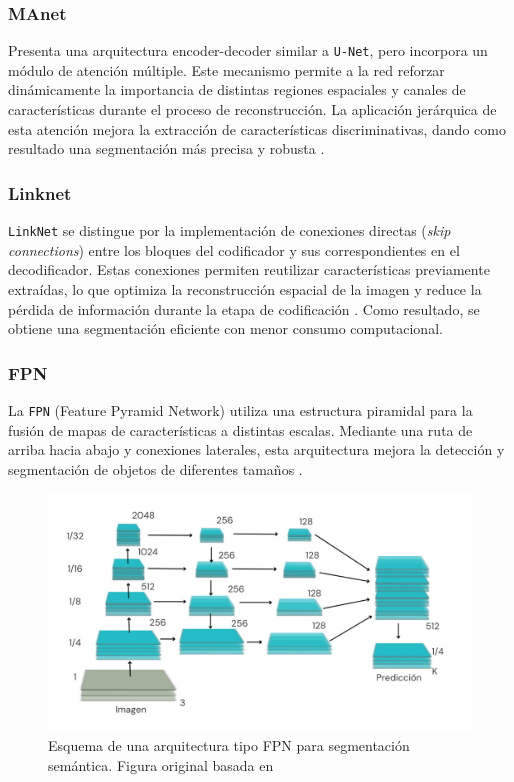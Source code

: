 \subsubsection{MAnet}
Presenta una arquitectura encoder-decoder similar a \texttt{U-Net}, pero incorpora un módulo de atención múltiple. Este mecanismo permite a la red reforzar dinámicamente la importancia de distintas regiones espaciales y canales de características durante el proceso de reconstrucción. La aplicación jerárquica de esta atención mejora la extracción de características discriminativas, dando como resultado una segmentación más precisa y robusta \cite{manet2020}.
\subsubsection{Linknet}
\texttt{LinkNet} se distingue por la implementación de conexiones directas (\textit{skip connections}) entre los bloques del codificador y sus correspondientes en el decodificador. Estas conexiones permiten reutilizar características previamente extraídas, lo que optimiza la reconstrucción espacial de la imagen y reduce la pérdida de información durante la etapa de codificación \cite{linknet2020}. Como resultado, se obtiene una segmentación eficiente con menor consumo computacional.
\subsubsection{FPN}
La \texttt{FPN} (Feature Pyramid Network) utiliza una estructura piramidal para la fusión de mapas de características a distintas escalas. Mediante una ruta de arriba hacia abajo y conexiones laterales, esta arquitectura mejora la detección y segmentación de objetos de diferentes tamaños \cite{fpnpresentation}.

\begin{figure}[h]
    \centering
    \includegraphics[width= \textwidth]{img/fpn_estructura.jpeg}
    \caption{Esquema de una arquitectura tipo FPN para segmentación semántica. Figura original basada en \cite{fpnpresentation} }
    \label{fig:fpn_diagrama}
\end{figure}

